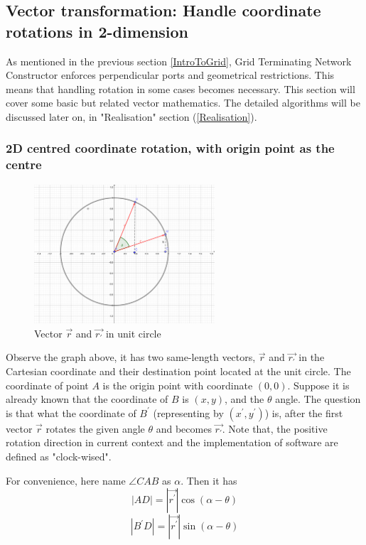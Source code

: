 \subsection{Vector transformation: Handle coordinate rotations in 2-dimension}

\par
As mentioned in the previous section \ref{IntroToGrid}, Grid Terminating Network Constructor enforces perpendicular ports
and geometrical restrictions. This means that handling rotation in some cases becomes necessary.
This section will cover some basic but related vector mathematics. The detailed algorithms will be discussed later on, in "Realisation" section (\ref{Realisation}).

\subsubsection{2D centred coordinate rotation, with origin point as the centre}
\par
\begin{figure}[H]
\begin{center}
\includegraphics[width=0.6\textwidth]{res/2d_vector.pdf}
\caption{Vector $\vec{r}$ and $\vec{r_{'}}$ in unit circle}
\end{center}
\end{figure}

Observe the graph above, it has two same-length vectors,  $\vec{r}$ and $\vec{r_{'}}$ in the Cartesian coordinate and their destination point located at the unit circle.
The coordinate of point $A$ is the origin point with coordinate $(0, 0)$. Suppose it is already known that the coordinate of $B$ is
$(x,y)$, and the $\theta$ angle. The question is that what the coordinate of $B^{'}$ (representing by $(x^{'},y^{'})$) is, after the first vector $\vec{r}$ rotates the given angle $\theta$ and becomes $\vec{r_{'}}$.
Note that, the positive rotation direction in current context and the implementation of software are defined as "clock-wised".
\par
For convenience, here name $\angle CAB $ as $\alpha$. Then it has
$$|AD| = |\vec{r^{'}}| \cos(\alpha - \theta)$$
$$|B^{'}D| = |\vec{r^{'}}| \sin(\alpha - \theta)$$

